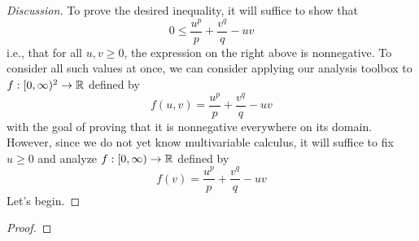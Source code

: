 \documentclass[../psets.tex]{subfiles}
\begin{document}
\begin{enumerate}[label={\textbf{\arabic*.}}]
\begin{enumerate}
\begin{proof}[Discussion]


            To prove the desired inequality, it will suffice to show that
            \begin{equation*}
                0 \leq \frac{u^p}{p}+\frac{v^q}{q}-uv
            \end{equation*}
            i.e., that for all $u,v\geq 0$, the expression on the right above is nonnegative. To consider all such values at once, we can consider applying our analysis toolbox to $f:[0,\infty)^2\to\mathbb{R}$ defined by
            \begin{equation*}
                f(u,v) = \frac{u^p}{p}+\frac{v^q}{q}-uv
            \end{equation*}
            with the goal of proving that it is nonnegative everywhere on its domain. However, since we do not yet know multivariable calculus, it will suffice to fix $u\geq 0$ and analyze $f:[0,\infty)\to\mathbb{R}$ defined by
            \begin{equation*}
                f(v) = \frac{u^p}{p}+\frac{v^q}{q}-uv
            \end{equation*}
            Let's begin.
        \end{proof}
        \begin{proof}


\end{proof}
\end{enumerate}
\end{enumerate}
\end{document}
